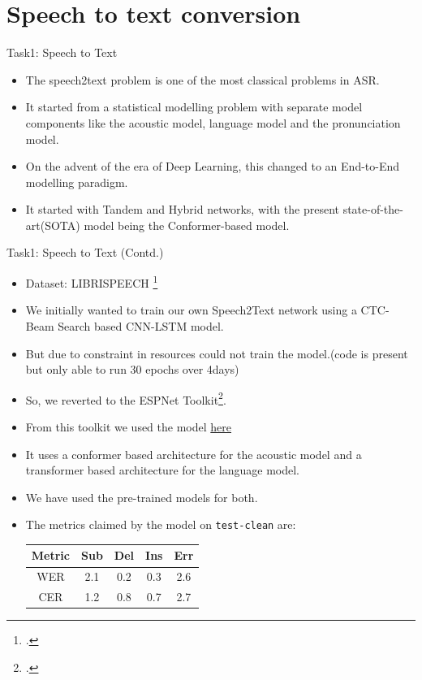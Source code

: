 \documentclass[10pt]{beamer}
\begin{document}
\section{Speech to text conversion}
\begin{frame}{Task1: Speech to Text}
\begin{itemize}
	\item The speech2text problem is one of the most classical problems in ASR.
	\item It started from a statistical modelling problem with separate model components like the acoustic model, language model and the pronunciation model.
	\item On the advent of the era of Deep Learning, this changed to an End-to-End modelling paradigm.
	\item It started with Tandem and Hybrid networks, with the present state-of-the-art(SOTA) model being the Conformer-based model.
\end{itemize}
\end{frame}

\begin{frame}{Task1: Speech to Text (Contd.)}
\begin{itemize}
	\item Dataset: LIBRISPEECH \footcite{librispeech}
	\item We initially wanted to train our own Speech2Text network using a CTC-Beam Search based CNN-LSTM model.
	\item But due to constraint in resources could not train the model.(code is present but only able to run 30 epochs over 4days)	
	\item So, we reverted to the ESPNet Toolkit\footcite{espnet}.
	\item From this toolkit we used the model \href{https://zenodo.org/record/4604011}{here} %
	\item It uses a conformer based architecture for the acoustic model and a transformer based architecture for the language model.
	\item We have used the pre-trained models for both.
	\item The metrics claimed by the model on \texttt{test-clean} are:
	\begin{center}
	\begin{tabular}{|c|c|c|c|c|}
	\hline
	Metric & Sub & Del & Ins & Err \\
	\hline
	WER & 2.1 & 0.2 & 0.3 & 2.6 \\
	CER & 1.2 & 0.8 & 0.7 & 2.7 \\
	\hline
	\end{tabular}
	\end{center}
	
\end{itemize}
\end{frame}
\end{document}
